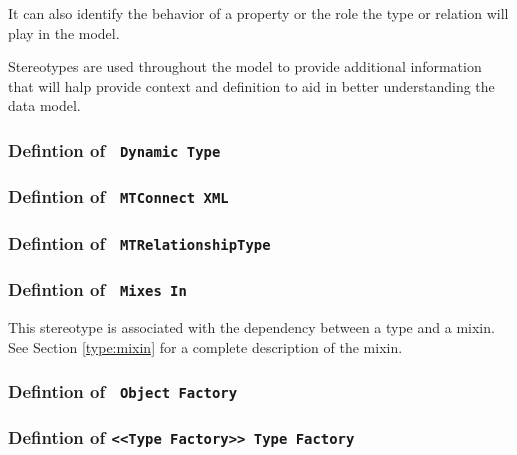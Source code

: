 It can also identify the behavior of a property or the role the type or relation
will play in the model. 

Stereotypes are used throughout the model to provide additional information that 
will halp provide context and definition to aid in better understanding the
data model.

\subsubsection{Defintion of \texttt{ Dynamic Type}} \label{type:Dynamic Type}

\FloatBarrier



\FloatBarrier
\subsubsection{Defintion of \texttt{ MTConnect XML}} \label{type:MTConnect XML}

\FloatBarrier



\FloatBarrier
\subsubsection{Defintion of \texttt{ MTRelationshipType}} \label{type:MTRelationshipType}

\FloatBarrier



\FloatBarrier
\subsubsection{Defintion of \texttt{ Mixes In}} \label{type:Mixes In}

\FloatBarrier

This stereotype is associated with the dependency between a type and a mixin. See Section \ref{type:mixin} for a complete 
description of the mixin.

\FloatBarrier
\subsubsection{Defintion of \texttt{ Object Factory}} \label{type:Object Factory}

\FloatBarrier



\FloatBarrier
\subsubsection{Defintion of \texttt{<<Type Factory>> Type Factory}} \label{type:Type Factory}

